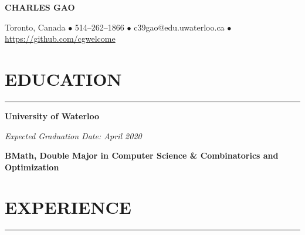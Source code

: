 \documentclass[9pt]{extarticle}
\begin{document}
\begin{center}
\textbf{\huge{CHARLES GAO}}

Toronto, Canada $\bullet$ 514--262--1866 $\bullet$ c39gao@edu.uwaterloo.ca
$\bullet$ \href{https://github.com/cgwelcome}{https://github.com/cgwelcome }
\end{center}

\section*{\large{EDUCATION}}
\rule[1em]{\textwidth}{0.3pt}
\begin{minipage}[t]{0.6\linewidth}
\begin{flushleft}
\textbf{University of Waterloo}\\
\end{flushleft}
\end{minipage}
\begin{minipage}[t]{0.39\linewidth}
\begin{flushright}
\textit{Expected Graduation Date: April 2020}
\end{flushright}
\end{minipage}

\textbf{BMath,
Double Major in Computer Science \& Combinatorics and Optimization}

\vfill

\section*{\large{EXPERIENCE}}
\rule[1em]{\textwidth}{0.3pt}
\end{document}
